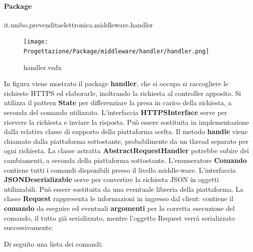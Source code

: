 \documentclass[a4paper]{article}
\begin{document}
\newpage

\paragraph{Package} it.unibo.prevenditaelettronica.middleware.handler


\begin{figure}[H]
    \texttt{[image: Progettazione/Package/middleware/handler/handler.png]}
    \centering
    \caption{handler.vsdx}
\end{figure}

In figura viene mostrato il package \textbf{handler}, che si occupa si raccogliere le richieste HTTPS ed elaborarle, inoltrando la richiesta al controller apposito. Si utilizza il pattern \textbf{State} per differenziare la presa in carico della richiesta, a seconda del comando utilizzato. L'interfaccia \textbf{HTTPSInterface} serve per ricevere la richiesta e inviare la risposta. Può essere sostituita in implementazione dalla relativa classe di supporto della piattaforma scelta. Il metodo \textbf{handle} viene chiamato dalla piattaforma sottostante, probabilmente da un thread separato per ogni richiesta. La classe astratta \textbf{AbstractRequestHandler} potrebbe subire dei cambiamenti, a seconda della piattaforma sottostante. L'enumeratore \textbf{Comando} contiene tutti i comandi disponibili presso il livello middle-ware. L'interfaccia \textbf{JSONDeserializable} serve per convertire la richiesta JSON in oggetti utilizzabili. Può essere sostituita da una eventuale libreria della piattaforma. La classe \textbf{Request} rappresenta le informazioni in ingresso dal client: contiene il \textbf{comando} da eseguire ed eventuali \textbf{argomenti} per la corretta esecuzione del comando, il tutto già serializzato, mentre l'oggetto Request verrà serializzato successivamente.

\newpage

Di seguito una lista dei comandi:
\end{document}
